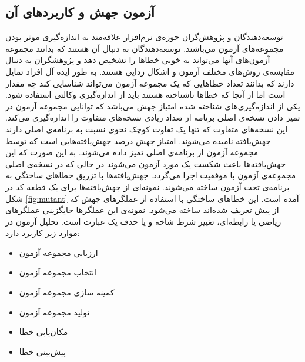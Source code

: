 
\subsection{آزمون جهش و کاربردهای آن}
توسعه‌دهندگان و پژوهش‌گران حوزه‌ی نرم‌افزار علاقه‌مند به اندازه‌گیری موثر بودن مجموعه‌های آزمون می‌باشند. توسعه‌دهندگان به دنبال آن هستند که بدانند مجموعه آزمون‌های آنها می‌تواند به خوبی خطاها را تشخیص دهد و پژوهشگران به دنبال مقایسه‌ی روش‌های مختلف آزمون و اشکال زدایی  هستند. به طور ایده آل افراد تمایل دارند که بدانند تعداد خطاهایی که یک مجموعه آزمون می‌تواند شناسایی کند چه مقدار است اما از آنجا که خطاها ناشناخته هستند باید از اندازه‌گیری  وکالتی استفاده شود. یکی از اندازه‌‌‌گیری‌های شناخته شده امتیاز جهش  می‌باشد که توانایی مجموعه آزمون در تمیز دادن نسخه‌ی اصلی برنامه از تعداد زیادی نسخه‌های متفاوت را اندازه‌گیری می‌کند. این نسخه‌های متفاوت که تنها یک تفاوت کوچک نحوی نسبت به برنامه‌ی اصلی دارند جهش‌یافته نامیده می‌شوند. امتیاز جهش درصد جهش‌یافته‌هایی  است که توسط مجموعه آزمون از برنامه‌ی اصلی تمیز داده می‌شوند. به این صورت که این جهش‌یافته‌ها باعث شکست یک مورد آزمون می‌شوند در حالی که در نسخه‌ی اصلی مجموعه‌ی آزمون با موفقیت اجرا می‌گردد. جهش‌یافته‌ها با تزریق خطاهای ساختگی به برنامه‌ی تحت آزمون  ساخته می‌شوند.  نمونه‌ای از  جهش‌یافته‌ها  برای یک قطعه کد در شکل \ref{fig:mutant} آمده است. این خطاهای ساختگی با استفاده از عملگرهای جهش که از پیش تعریف شده‌اند ساخته می‌شود. نمونه‌ی این عملگرها جایگزینی عملگرهای ریاضی یا رابطه‌ای، تغییر شرط شاخه  و یا حذف یک عبارت است\cite{just2014mutants}. تحلیل آزمون در موارد زیر کاربرد دارد:
\begin{itemize}
	\setlength\itemsep{.01em}	
	\item 
	ارزیابی مجموعه آزمون
	\item 
	انتخاب مجموعه آزمون
	\item 
	 کمینه سازی مجموعه آزمون
	\item 
	 تولید مجموعه آزمون
	\item 
	مکان‌یابی خطا
	\item 
	پیش‌بینی خطا
\end{itemize}

